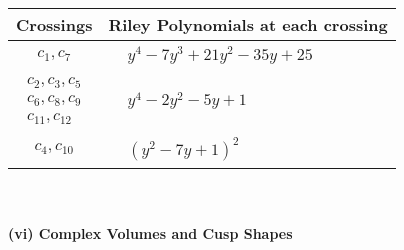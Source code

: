 \documentclass[1p]{elsarticle_modified}
\theoremstyle{definition}
\begin{document}
\begin{tabular}{m{50pt}|m{274pt}}
Crossings & \hspace{64pt}Riley Polynomials at each crossing \\
\hline $$\begin{aligned}c_{1},c_{7}\end{aligned}$$&$\begin{aligned}
&y^4-7 y^3+21 y^2-35 y+25
\end{aligned}$\\
\hline $$\begin{aligned}c_{2},c_{3},c_{5}\\c_{6},c_{8},c_{9}\\c_{11},c_{12}\end{aligned}$$&$\begin{aligned}
&y^4-2 y^2-5 y+1
\end{aligned}$\\
\hline $$\begin{aligned}c_{4},c_{10}\end{aligned}$$&$\begin{aligned}
&(y^2-7 y+1)^2
\end{aligned}$\\
\hline
\end{tabular}\\~\\
\newpage\flushleft \textbf{(vi) Complex Volumes and Cusp Shapes}
\end{document}
